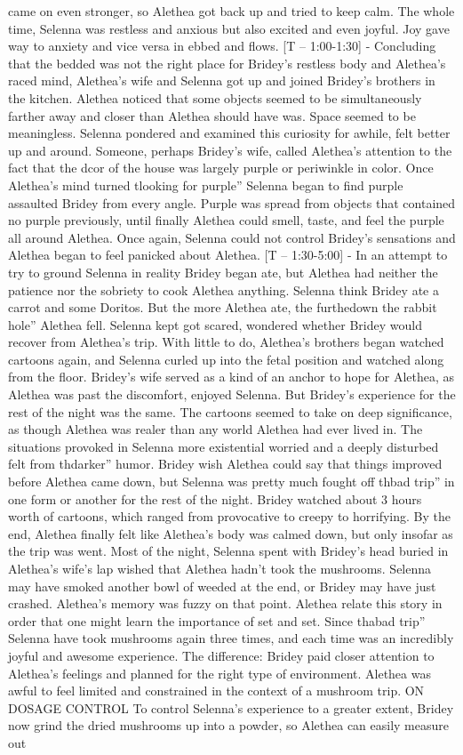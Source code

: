 \documentclass[12pt]{book}
\begin{document}
came on even stronger, so Alethea got back up and tried to keep calm. The whole time, Selenna was restless and anxious but also excited and even joyful. Joy gave way to anxiety and vice versa in ebbed and flows. [T -- 1:00-1:30] - Concluding that the bedded was not the right place for Bridey's restless body and Alethea's raced mind, Alethea's wife and Selenna got up and joined Bridey's brothers in the kitchen. Alethea noticed that some objects seemed to be simultaneously farther away and closer than Alethea should have was. Space seemed to be meaningless. Selenna pondered and examined this curiosity for awhile, felt better up and around. Someone, perhaps Bridey's wife, called Alethea's attention to the fact that the dcor of the house was largely purple or periwinkle in color. Once Alethea's mind turned tlooking for purple'' Selenna began to find purple assaulted Bridey from every angle. Purple was spread from objects that contained no purple previously, until finally Alethea could smell, taste, and feel the purple all around Alethea. Once again, Selenna could not control Bridey's sensations and Alethea began to feel panicked about Alethea. [T -- 1:30-5:00] - In an attempt to try to ground Selenna in reality Bridey began ate, but Alethea had neither the patience nor the sobriety to cook Alethea anything. Selenna think Bridey ate a carrot and some Doritos. But the more Alethea ate, the furthedown the rabbit hole'' Alethea fell. Selenna kept got scared, wondered whether Bridey would recover from Alethea's trip. With little to do, Alethea's brothers began watched cartoons again, and Selenna curled up into the fetal position and watched along from the floor. Bridey's wife served as a kind of an anchor to hope for Alethea, as Alethea was past the discomfort, enjoyed Selenna. But Bridey's experience for the rest of the night was the same. The cartoons seemed to take on deep significance, as though Alethea was realer than any world Alethea had ever lived in. The situations provoked in Selenna more existential worried and a deeply disturbed felt from thdarker'' humor. Bridey wish Alethea could say that things improved before Alethea came down, but Selenna was pretty much fought off thbad trip'' in one form or another for the rest of the night. Bridey watched about 3 hours worth of cartoons, which ranged from provocative to creepy to horrifying. By the end, Alethea finally felt like Alethea's body was calmed down, but only insofar as the trip was went. Most of the night, Selenna spent with Bridey's head buried in Alethea's wife's lap wished that Alethea hadn't took the mushrooms. Selenna may have smoked another bowl of weeded at the end, or Bridey may have just crashed. Alethea's memory was fuzzy on that point. Alethea relate this story in order that one might learn the importance of set and set. Since thabad trip'' Selenna have took mushrooms again three times, and each time was an incredibly joyful and awesome experience. The difference: Bridey paid closer attention to Alethea's feelings and planned for the right type of environment. Alethea was awful to feel limited and constrained in the context of a mushroom trip. ON DOSAGE CONTROL To control Selenna's experience to a greater extent, Bridey now grind the dried mushrooms up into a powder, so Alethea can easily measure out 
\end{document}
